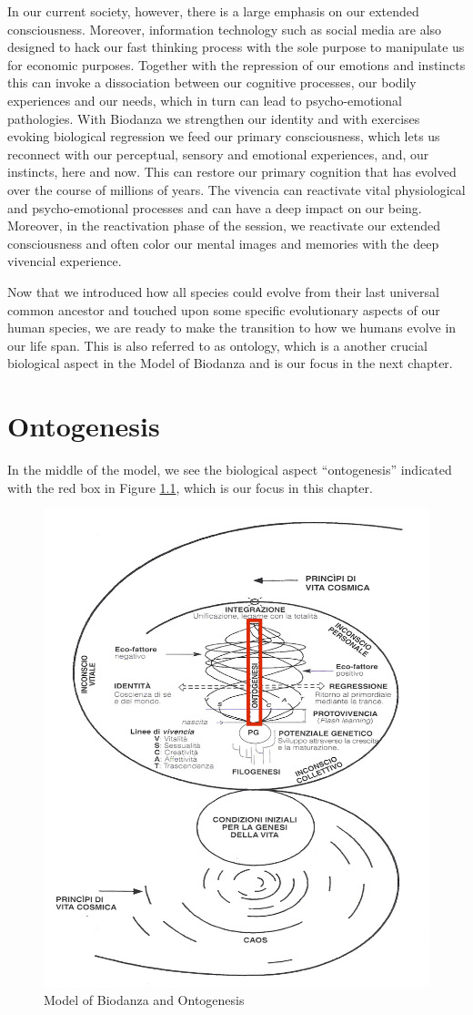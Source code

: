 \documentclass[
  11pt,
]{book}
\begin{document}
In our current society, however, there is a large emphasis on our extended consciousness. Moreover, information technology such as social media are also designed to hack our fast thinking process with the sole purpose to manipulate us for economic purposes. Together with the repression of our emotions and instincts this can invoke a dissociation between our cognitive processes, our bodily experiences and our needs, which in turn can lead to psycho-emotional pathologies. With Biodanza we strengthen our identity and with exercises evoking biological regression we feed our primary consciousness, which lets us reconnect with our perceptual, sensory and emotional experiences, and, our instincts, here and now. This can restore our primary cognition that has evolved over the course of millions of years. The vivencia can reactivate vital physiological and psycho-emotional processes and can have a deep impact on our being. Moreover, in the reactivation phase of the session, we reactivate our extended consciousness and often color our mental images and memories with the deep vivencial experience.

Now that we introduced how all species could evolve from their last universal common ancestor and touched upon some specific evolutionary aspects of our human species, we are ready to make the transition to how we humans evolve in our life span. This is also referred to as ontology, which is a another crucial biological aspect in the Model of Biodanza and is our focus in the next chapter.

\hypertarget{ontogenesis}{%
\chapter{Ontogenesis}\label{ontogenesis}}

In the middle of the model, we see the biological aspect ``ontogenesis'' indicated with the red box in Figure \ref{fig:modelOnto}, which is our focus in this chapter.

\begin{figure}

{\centering \includegraphics[width=0.5\linewidth]{./figs/biologischeAspectenBiodanzaDeelIII} 

}

\caption{Model of Biodanza and Ontogenesis}\label{fig:modelOnto}
\end{figure}
\end{document}
